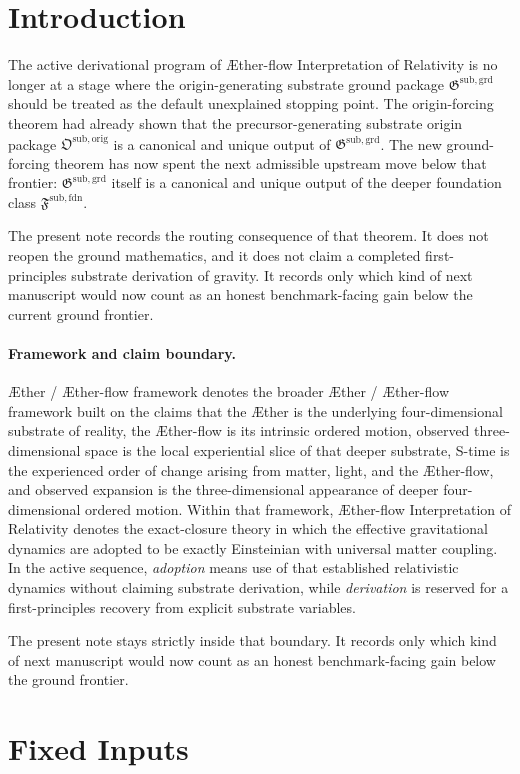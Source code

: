 \documentclass[11pt]{article}
\newcommand{\Aether}{\AE{}ther}
\newcommand{\Aflow}{\AE{}ther-flow}
\newcommand{\TheoryName}{\Aflow{} Interpretation of Relativity}
\newcommand{\TheoryProgram}{\Aether{} / \Aflow{} framework}
\newcommand{\OriginPackage}{\mathfrak O^{\mathrm{sub,orig}}}
\newcommand{\GroundPackage}{\mathfrak G^{\mathrm{sub,grd}}}
\newcommand{\FoundationPackage}{\mathfrak F^{\mathrm{sub,fdn}}}
\begin{document}
\section{Introduction}

The active derivational program of \TheoryName{} is no longer at a stage where the origin-generating substrate ground package \(\GroundPackage\) should be treated as the default unexplained stopping point. The origin-forcing theorem had already shown that the precursor-generating substrate origin package \(\OriginPackage\) is a canonical and unique output of \(\GroundPackage\). The new ground-forcing theorem has now spent the next admissible upstream move below that frontier: \(\GroundPackage\) itself is a canonical and unique output of the deeper foundation class \(\FoundationPackage\).

The present note records the routing consequence of that theorem. It does not reopen the ground mathematics, and it does not claim a completed first-principles substrate derivation of gravity. It records only which kind of next manuscript would now count as an honest benchmark-facing gain below the current ground frontier.

\paragraph{Framework and claim boundary.}
\TheoryProgram{} denotes the broader \Aether{} / \Aflow{} framework built on the claims that the \Aether{} is the underlying four-dimensional substrate of reality, the \Aflow{} is its intrinsic ordered motion, observed three-dimensional space is the local experiential slice of that deeper substrate, S-time is the experienced order of change arising from matter, light, and the \Aflow{}, and observed expansion is the three-dimensional appearance of deeper four-dimensional ordered motion. Within that framework, \TheoryName{} denotes the exact-closure theory in which the effective gravitational dynamics are adopted to be exactly Einsteinian with universal matter coupling. In the active sequence, \emph{adoption} means use of that established relativistic dynamics without claiming substrate derivation, while \emph{derivation} is reserved for a first-principles recovery from explicit substrate variables.

The present note stays strictly inside that boundary. It records only which kind of next manuscript would now count as an honest benchmark-facing gain below the ground frontier.

\section{Fixed Inputs}
\end{document}
